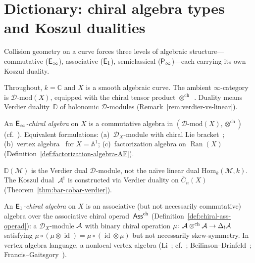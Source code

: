 \section{Dictionary: chiral algebra types and Koszul dualities}
\label{sec:dictionary}

Collision geometry on a curve forces three levels of algebraic
structure---commutative ($\Einf$), associative ($\Eone$),
semiclassical ($\mathsf{P}_{\infty}$)---each carrying its own Koszul duality.

\begin{definition}[\texorpdfstring{$\Einf$}{E-infinity}-chiral algebra = vertex algebra]
\label{def:einf-chiral}
Throughout, $k = \mathbb{C}$ and $X$ is a smooth algebraic curve.
The ambient $\infty$-category is $\mathcal{D}\text{-mod}(X)$,
equipped with the chiral tensor product
$\otimes^{\mathrm{ch}}$~\cite[\S3.4]{BD04}.  Duality means
Verdier duality~$\mathbb{D}$ of holonomic $\mathcal{D}$-modules
(Remark~\ref{rem:verdier-vs-linear}).

An \emph{$\Einf$-chiral algebra} on $X$ is a commutative algebra
in $(\mathcal{D}\text{-mod}(X),\allowbreak
\otimes^{\mathrm{ch}})$
(cf.~\cite[§5.1]{HA}).
Equivalent formulations:
(a)~$\mathcal{D}_X$-module with chiral Lie
bracket~\cite[\S3.3]{BD04};
(b)~vertex algebra~\cite[\S3.7]{FBZ04} for $X = \mathbb{A}^1$;
(c)~factorization algebra on $\operatorname{Ran}(X)$
(Definition~\ref{def:factorization-algebra-AF}).
\end{definition}

\begin{remark}
\label{rem:verdier-vs-linear}
$\mathbb{D}(\mathcal{M})$ is the Verdier dual
$\mathcal{D}$-module, not the na\"{\i}ve linear dual
$\mathrm{Hom}_k(\mathcal{M}, k)$.  The Koszul
dual~$\mathcal{A}^!$ is constructed via Verdier duality on
$\overline{C}_n(X)$
(Theorem~\ref{thm:bar-cobar-verdier}).
\end{remark}

\begin{definition}[\texorpdfstring{$\Eone$}{E1}-chiral algebra = nonlocal vertex algebra]
\label{def:e1-chiral}
An \emph{$\Eone$-chiral algebra} on $X$ is an associative (but not
necessarily commutative) algebra over the associative chiral
operad~$\mathsf{Ass}^{\mathrm{ch}}$ (Definition~\ref{def:chiral-ass-operad}):
a $\mathcal{D}_X$-module $\mathcal{A}$ with binary chiral operation
$\mu\colon \mathcal{A} \otimes^{\mathrm{ch}} \mathcal{A} \to \Delta_!\mathcal{A}$
satisfying $\mu \circ (\mu \otimes \operatorname{id})
= \mu \circ (\operatorname{id} \otimes \mu)$
but not necessarily skew-symmetry.
In vertex algebra language, a nonlocal vertex algebra
(Li~\cite{Li96}; cf.~\cite[\S4.1]{HA};
Beilinson--Drinfeld~\cite[Theorem~3.4.9]{BD04};
Francis--Gaitsgory~\cite{FG12}).
\end{definition}


